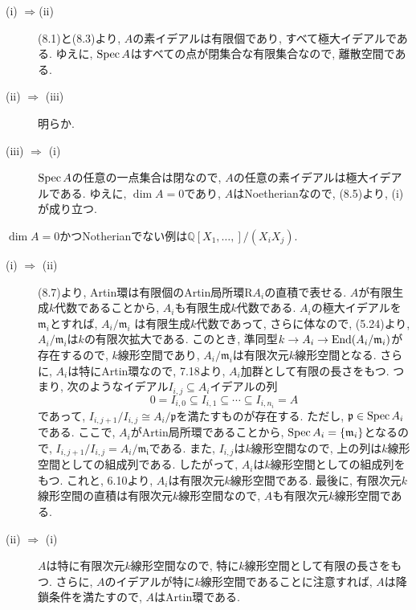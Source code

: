 \documentclass[dvipdfmx]{jsarticle}
\begin{document}
    \begin{problem}
        \begin{description}
            \item[(i) $\Rightarrow$(ii)]
                (8.1)と(8.3)より, $A$の素イデアルは有限個であり, すべて極大イデアルである.
                ゆえに, $\operatorname{Spec}{A}$はすべての点が閉集合な有限集合なので, 離散空間である.
            \item[(ii) $\Rightarrow$ (iii)]
                明らか.
            \item[(iii) $\Rightarrow$ (i)]
                $\operatorname{Spec}{A}$の任意の一点集合は閉なので, $A$の任意の素イデアルは極大イデアルである.
                ゆえに, $\dim{A} = 0$であり, $A$はNoetherianなので, (8.5)より, (i)が成り立つ.
        \end{description}
    \end{problem}

    \begin{note}
        $\dim{A} = 0$かつNotherianでない例は$\mathbb{Q}[X_1, \dots, ]/(X_iX_j)$.
    \end{note}

    \begin{problem}
        \begin{description}
            \item[(i) $\Rightarrow$ (ii)] (8.7)より, Artin環は有限個のArtin局所環R$A_i$の直積で表せる.
            $A$が有限生成$k$代数であることから, $A_i$も有限生成$k$代数である.
            $A_i$の極大イデアルを$\mathfrak{m}_i$とすれば, $A_i/\mathfrak{m}_i$
            は有限生成$k$代数であって, さらに体なので, (5.24)より,
            $A_i/\mathfrak{m}_i$は$k$の有限次拡大である.
            このとき, 準同型$k \to A_i \to \operatorname{End}(A_i/\mathfrak{m}_i)$が存在するので, $k$線形空間であり,
            $A_i/\mathfrak{m}_i$は有限次元$k$線形空間となる.
            さらに, $A_i$は特にArtin環なので, \color{red}7.18\color{black}より,
            $A_i$加群として有限の長さをもつ.
            つまり, 次のようなイデアル$I_{i,j} \subseteq A_i$イデアルの列
            \[
                0 = I_{i,0} \subseteq I_{i,1} \subseteq \cdots \subseteq I_{i,n_i} = A
            \]
            であって, $I_{i,j+1}/I_{i,j} \cong A_i/\mathfrak{p}$を満たすものが存在する.
            ただし, $\mathfrak{p} \in \operatorname{Spec}{A_i}$である.
            ここで, $A_i$がArtin局所環であることから, $\operatorname{Spec}{A_i}  = \{\mathfrak{m}_i\}$となるので,
            $I_{i, j+1}/I_{i,j} = A_i/\mathfrak{m_i}$である.
            また, $I_{i,j}$は$k$線形空間なので, 上の列は$k$線形空間としての組成列である.
            したがって, $A_i$は$k$線形空間としての組成列をもつ.
            これと, 6.10より, $A_i$は有限次元$k$線形空間である.
            最後に, 有限次元$k$線形空間の直積は有限次元$k$線形空間なので, $A$も有限次元$k$線形空間である.
            \item [(ii) $\Rightarrow$ (i)]
            $A$は特に有限次元$k$線形空間なので, 特に$k$線形空間として有限の長さをもつ.
            さらに, $A$のイデアルが特に$k$線形空間であることに注意すれば, $A$は降鎖条件を満たすので, $A$はArtin環である.
         \end{description}
    \end{problem}
\end{document}
